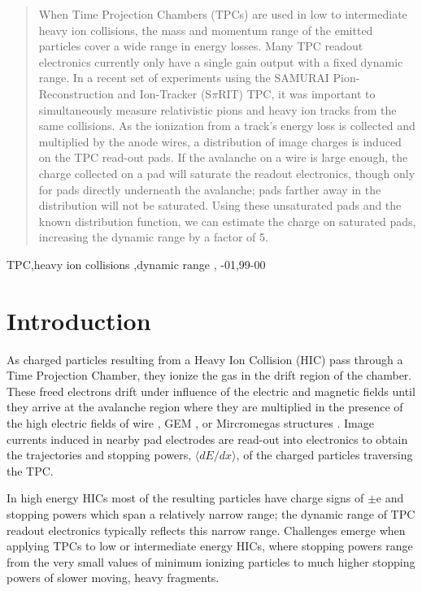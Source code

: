 \documentclass[review,number,sort&compress]{elsarticle}
\begin{document}
\begin{frontmatter}
\begin{abstract}

When Time Projection Chambers (TPCs) are used in low to intermediate heavy ion collisions, the mass and momentum range of the emitted particles cover a wide range in energy losses. Many TPC readout electronics currently only have a single gain output with a fixed dynamic range. In a recent set of experiments using the SAMURAI Pion-Reconstruction and Ion-Tracker (S$\pi$RIT) TPC, it was important to simultaneously measure relativistic pions and heavy ion tracks from the same collisions. As the ionization from a track's energy loss is collected and multiplied by the anode wires, a distribution of image charges is induced on the TPC read-out pads. If the avalanche on a wire is large enough, the charge collected on a pad will saturate the readout electronics, though only for pads directly underneath the avalanche; pads farther away in the distribution will not be saturated. Using these unsaturated pads and the known distribution function, we can estimate the charge on saturated pads, increasing the dynamic range by a factor of 5.

\end{abstract}

\begin{keyword}
TPC\sep heavy ion collisions \sep dynamic range \sep 
{}-01\sep  99-00
\end{keyword}

\end{frontmatter}

\section{Introduction} 

As charged particles resulting from a Heavy Ion Collision (HIC) pass through a Time Projection Chamber, they ionize the gas in the drift region of the chamber. These freed electrons drift under influence of the electric and magnetic fields until they arrive at the avalanche region where they are multiplied in the presence of the high electric fields of wire \cite{blumrol}, GEM \cite{gem}, or Mircromegas structures \cite{micromeg}. Image currents induced in nearby pad electrodes are read-out into electronics to obtain the trajectories and stopping powers, $\langle dE/dx\rangle$, of the charged particles traversing the TPC.

In high energy HICs most of the resulting particles have charge signs of $\pm$e and stopping powers which span a relatively narrow range; the dynamic range of TPC readout electronics typically reflects this narrow range. Challenges emerge when applying TPCs to low or intermediate energy HICs, where stopping powers range from the very small values of minimum ionizing particles to much higher stopping powers of slower moving, heavy fragments. 
\end{document}

